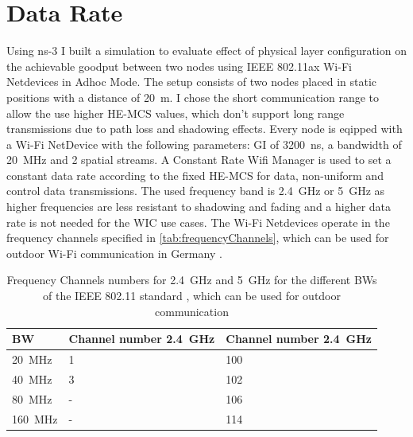 \section{Data Rate}

Using ns-3 I built a simulation to evaluate effect of physical layer configuration on the achievable goodput between two nodes using IEEE 802.11ax Wi-Fi Netdevices in Adhoc Mode.
The setup consists of two nodes placed in static positions with a distance of \SI{20}{\metre}. I chose the short communication range to allow the use higher HE-\ac{MCS} values, which don't support long range transmissions due to path loss and shadowing effects.
Every node is eqipped with a Wi-Fi NetDevice with the following parameters: \ac{GI} of \SI{3200}{\nano\second}, a bandwidth of \SI{20}{\mega\hertz} and 2 spatial streams.
A Constant Rate Wifi Manager is used to set a constant data rate according to the fixed HE-\ac{MCS} for data, non-uniform and control data transmissions. The used frequency band is \SI{2.4}{\giga\hertz} or \SI{5}{\giga\hertz} as
higher frequencies are less resistant to shadowing and fading and a higher data rate is not needed for the \ac{WIC} use cases.
The Wi-Fi Netdevices operate in the frequency channels specified in \autoref{tab:frequencyChannels}, which can be used for
outdoor Wi-Fi communication in Germany \cite{GermanLaw}.

\begin{table}
	\centering
	\begin{tabular}{>{\centering}p{2cm}p{4cm}p{4cm}}
		\toprule
		\ac{BW} & Channel number \SI{2.4}{\giga\hertz} & Channel number \SI{2.4}{\giga\hertz}\\
		\midrule
		\SI{20}{\mega\hertz} & \num{1}&
		\num{100} \\
		\SI{40}{\mega\hertz} &
		\num{3}
		& \num{102} \\
		\SI{80}{\mega\hertz} &
		- & \num{106} \\
		\SI{160}{\mega\hertz} & -
		& \num{114} \\
		\bottomrule
	\end{tabular}
	\caption{Frequency Channels numbers for \SI{2.4}{\giga\hertz} and \SI{5}{\giga\hertz} for the different \ac{BW}s of the IEEE 802.11 standard \cite{noauthor_ieee_2021-1}, which can be used for
	outdoor communication \cite{GermanLaw}}
	\label{tab:frequencyChannels}
\end{table}



